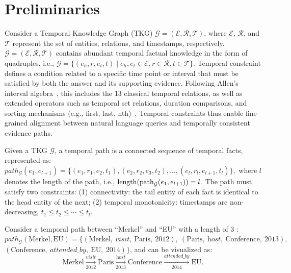 
\vspace{-2mm}
\section{Preliminaries}
\label{sec:preliminaries}
Consider a Temporal Knowledge Graph (TKG) $\mathcal{G} = (\mathcal{E}, \mathcal{R}, \mathcal{T})$, where $\mathcal{E}$, $\mathcal{R}$, and $\mathcal{T}$ represent the set of entities, relations, and timestamps, respectively. 
$\mathcal{G} = (\mathcal{E}, \mathcal{R}, \mathcal{T})$ contains abundant temporal factual knowledge in the form of quadruples, i.e., $\mathcal{G} = \{(e_h, r, e_t, t) \mid e_h,e_t \in \mathcal{E}, r \in \mathcal{R}, t \in \mathcal{T} \}$.
% 
Temporal constraint defines a condition related to a specific time point or interval that must be satisfied by both the answer and its supporting evidence. Following Allen's interval algebra~\cite{allen1984towards}, this includes the 13 classical temporal relations, as well as extended operators such as temporal set relations, duration comparisons, and sorting mechanisms (e.g., first, last, nth)~\cite{TimelineKGQA}. Temporal constraints thus enable fine-grained alignment between natural language queries and temporally consistent evidence paths.




\begin{definition} 
Given a TKG $\mathcal{G}$, a temporal  path is a connected sequence of temporal facts, represented as:  
$
path_{\mathcal{G}}(e_1, e_{l+1}) = \{(e_1, r_1, e_2, t_1), (e_2, r_2, e_3, t_2), \ldots, (e_l, r_l, e_{l+1}, t_l)\},$ where $l$ denotes the length of the path, i.e., ${\rm{length}}({\rm{path}}_{\mathcal{G}}(e_1, e_{l+1})) = l$. The path must satisfy two constraints:  
(1) connectivity: the tail entity of each fact is identical to the head entity of the next;  
(2) temporal monotonicity: timestamps are non-decreasing, \ie $t_1 \leq t_2 \leq \cdots \leq t_l$.  

\end{definition}


\begin{example}
Consider a temporal path between ``Merkel'' and ``EU'' with a length of 3 :
$path_{\mathcal{G}}(\text{Merkel}, \text{EU}) = \{
(\text{Merkel},~\textit{visit},~\text{Paris},~2012),~
(\text{Paris},~\textit{host},~\text{Conference},~2013),$ $
(\text{Conference},~\textit{attended\_by},~\text{EU},~2014)
\}$,
and can be visualized as:
\[
\text{Merkel} \xrightarrow[\text{2012}]{\textit{visit}} 
\text{Paris} \xrightarrow[\text{2013}]{\textit{host}} 
\text{Conference} \xrightarrow[\text{2014}]{\textit{attended\_by}} 
\text{EU}.
\]
\end{example}

